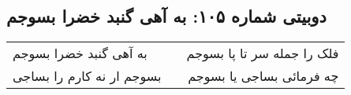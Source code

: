 \begin{center}
\section*{دوبیتی شماره ۱۰۵: به آهی گنبد خضرا بسوجم}
\label{sec:105}
\begin{longtable}{l p{0.5cm} r}
به آهی گنبد خضرا بسوجم
&&
فلک را جمله سر تا پا بسوجم
\\
بسوجم ار نه کارم را بساجی
&&
چه فرمائی بساجی یا بسوجم
\\
\end{longtable}
\end{center}
